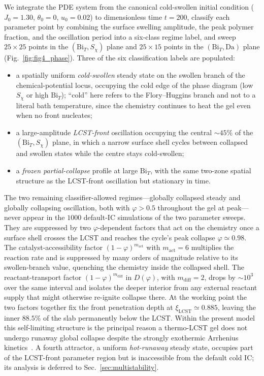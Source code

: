 \documentclass[aps,pre,reprint,superscriptaddress,longbibliography,floatfix]{revtex4-2}
\newcommand{\Da}{\mathrm{Da}}
\newcommand{\Bi}{\mathrm{Bi}}
\begin{document}
We integrate the PDE system from the canonical cold-swollen initial
condition ($J_0=1.30$, $\theta_0=0$, $u_0=0.02$) to dimensionless
time $t=200$, classify each parameter point by combining the surface
swelling amplitude, the peak polymer fraction, and the oscillation
period into a six-class regime label, and sweep $25\times25$ points
in the $(\Bi_T, S_\chi)$ plane and $25\times15$ points in the
$(\Bi_T, \Da)$ plane (Fig.~\ref{fig:fig4_phase}).  Three of the six
classification labels are populated:
\begin{itemize}
\item[\textbf{(i)}] a spatially uniform \emph{cold-swollen} steady
  state on the swollen branch of the chemical-potential locus,
  occupying the cold edge of the phase diagram (low $S_\chi$ or high
  $\Bi_T$); ``cold'' here refers to the Flory--Huggins branch and
  not to a literal bath temperature, since the chemistry continues
  to heat the gel even when no front nucleates;
\item[\textbf{(ii)}] a large-amplitude \emph{LCST-front} oscillation
  occupying the central $\sim\!45\%$ of the $(\Bi_T,S_\chi)$ plane,
  in which a narrow surface shell cycles between collapsed and
  swollen states while the centre stays cold-swollen;
\item[\textbf{(iii)}] a \emph{frozen partial-collapse} profile at
  large $\Bi_T$, with the same two-zone spatial structure as the
  LCST-front oscillation but stationary in time.
\end{itemize}
The two remaining classifier-allowed regimes—globally collapsed
steady and globally collapsing oscillation, both with $\varphi>0.5$
throughout the gel at peak—never appear in the $1000$ default-IC
simulations of the two parameter sweeps. They are suppressed by two
$\varphi$-dependent factors that act on the chemistry once a surface
shell crosses the LCST and reaches the cycle's peak collapse
$\varphi\!\simeq\!0.98$. The catalyst-accessibility factor
$(1-\varphi)^{m_\mathrm{act}}$ with $m_\mathrm{act}\!=\!6$
multiplies the reaction rate and is suppressed by many orders of
magnitude relative to its swollen-branch value, quenching the
chemistry inside the collapsed shell. The reactant-transport factor
$(1-\varphi)^{m_\mathrm{diff}}$ in $D(\varphi)$, with
$m_\mathrm{diff}\!=\!2$, drops by $\sim\!10^3$ over the same
interval and isolates the deeper interior from any external
reactant supply that might otherwise re-ignite collapse there. At
the working point the two factors together fix the front
penetration depth at $\xi_\mathrm{LCST}\!\simeq\!0.885$, leaving
the inner $88.5\%$ of the slab permanently below the LCST. Within
the present model this self-limiting structure is the principal
reason a thermo-LCST gel does not undergo runaway global collapse
despite the strongly exothermic Arrhenius
kinetics~\cite{FrankKamenetskii1969,Uppal1974}. A fourth
attractor, a uniform \emph{hot-runaway} steady state, occupies part
of the LCST-front parameter region but is inaccessible from the
default cold IC; its analysis is deferred to
Sec.~\ref{sec:multistability}.
\end{document}
